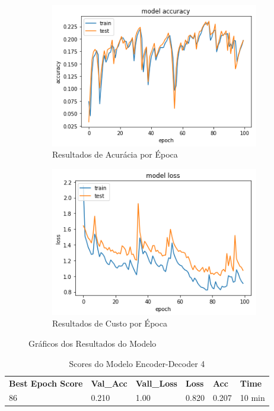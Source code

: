 \begin{figure}[H]
  \centering
  \begin{subfigure}[b]{0.45\linewidth}
    \includegraphics[width=\linewidth]{img/enc-dec-4.png}
    \caption{Resultados de Acurácia por Época}
  \end{subfigure}
  \begin{subfigure}[b]{0.45\linewidth}
    \includegraphics[width=\linewidth]{img/enc-dec-4-loss.png}
    \caption{Resultados de Custo por Época}
  \end{subfigure}
  \caption{Gráficos dos Resultados do Modelo}
  \label{fig:plots4}
\end{figure}

\begin{table}[H]
\centering
\begin{tabular}{llllll}
\textbf{Best Epoch Score} & \textbf{Val\_Acc} & \textbf{Vall\_Loss} & \textbf{Loss} & \textbf{Acc} & \textbf{Time} \\
86 & 0.210 & 1.00 & 0.820 & 0.207 & 10 min
\end{tabular}
\caption{Scores do Modelo Encoder-Decoder 4}
\label{tab:res-enc-dec-4}
\end{table}

